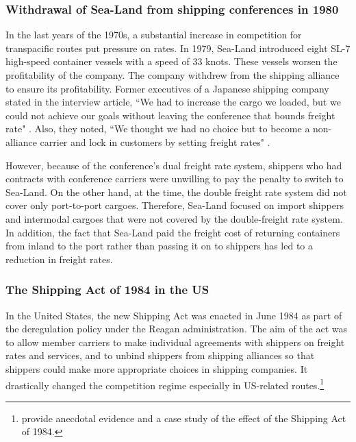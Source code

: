 \documentclass[11pt]{article}
\begin{document}
\subsubsection{Withdrawal of Sea-Land from shipping conferences in 1980}\label{subsec:withdrawal_of_sea-land_from_cartel_in_1980}
In the last years of the 1970s, a substantial increase in competition for transpacific routes put pressure on rates. In 1979, Sea-Land introduced eight SL-7 high-speed container vessels with a speed of 33 knots. These vessels worsen the profitability of the company. The company withdrew from the shipping alliance to ensure its profitability. Former executives of a Japanese shipping company stated in the interview article, ``We had to increase the cargo we loaded, but we could not achieve our goals without leaving the conference that bounds freight rate" \citep{JapanMaritimeDaily2006}. Also, they noted, ``We thought we had no choice but to become a non-alliance carrier and lock in customers by setting freight rates" \citep{JapanMaritimeDaily2006}.

However, because of the conference's dual freight rate system, shippers who had contracts with conference carriers were unwilling to pay the penalty to switch to Sea-Land. On the other hand, at the time, the double freight rate system did not cover only port-to-port cargoes. Therefore, Sea-Land focused on import shippers and intermodal cargoes that were not covered by the double-freight rate system. In addition, the fact that Sea-Land paid the freight cost of returning containers from inland to the port rather than passing it on to shippers has led to a reduction in freight rates.

\subsubsection{The Shipping Act of 1984 in the US}\label{subsec:shipping_act_of_1984}

In the United States, the new Shipping Act was enacted in June 1984 as part of the deregulation policy under the Reagan administration. The aim of the act was to allow member carriers to make individual agreements with shippers on freight rates and services, and to unbind shippers from shipping alliances so that shippers could make more appropriate choices in shipping companies. It drastically changed the competition regime especially in US-related routes.\footnote{\cite{wilson1991some} provide anecdotal evidence and a case study of the effect of the Shipping Act of 1984.}  
\end{document}
